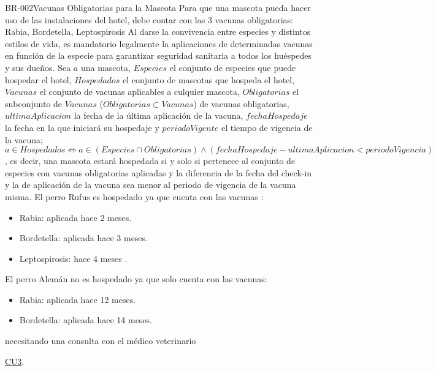 \begin{BussinesRule}[%
	\brClassification{\btEnabler}{\bcCondition}{\blStrict}
	]{BR-002}{Vacunas Obligatorias para la Mascota}
	\BRitem[Descripción:] Para que una mascota pueda hacer uso de las instalaciones del hotel, debe contar con las 3 vacunas obligatorias: Rabia, Bordetella, Leptospirosis
	\BRitem[Motivación:] Al darse la convivencia entre especies y distintos estilos de vida, es mandatorio legalmente la aplicaciones de determinadas vacunas en función de la especie para garantizar seguridad sanitaria a todos los huéspedes y sus dueños.
	\BRitem[Sentencia:] Sea $a$ una mascota, $Especies$ el conjunto de especies que puede hospedar el hotel, $Hospedados$ el conjunto de mascotas que hospeda el hotel, $Vacunas$ el conjunto de vacunas aplicables a culquier mascota, $Obligatorias$ el subconjunto de $Vacunas$ ($Obligatorias\subset Vacunas$) de vacunas obligatorias, $ultimaAplicacion$ la fecha de la última aplicación de la vacuna, $fechaHospedaje$ la fecha en la que iniciará su hospedaje y $periodoVigente$ el tiempo de vigencia de la vacuna; $a \in Hospedados \iff a\in (Especies\cap  Obligatorias) \land (fechaHospedaje - ultimaAplicacion < periodoVigencia)$, es decir, una mascota estará hospedada si y solo si pertenece al conjunto de especies con vacunas obligatorias aplicadas y la diferencia de la fecha del check-in y la de aplicación de la vacuna sea menor al periodo de vigencia de la vacuna misma.
	 El perro Rufus es hospedado ya que cuenta con las vacunas :
	\begin{itemize}
        		\item Rabia: aplicada hace 2 meses.
		\item Bordetella: aplicada hace 3 meses.
		\item Leptospirosis: hace 4 meses .
	\end{itemize}
	
	 El perro Alemán no es hospedado ya que solo cuenta con las vacunas:
	\begin{itemize}
        		\item Rabia: aplicada hace 12 meses.
		\item Bordetella: aplicada hace 14 meses.
	\end{itemize}
	necesitando una consulta con el médico veterinario
	
	 \hyperlink{CU3}{CU3}.
\end{BussinesRule}